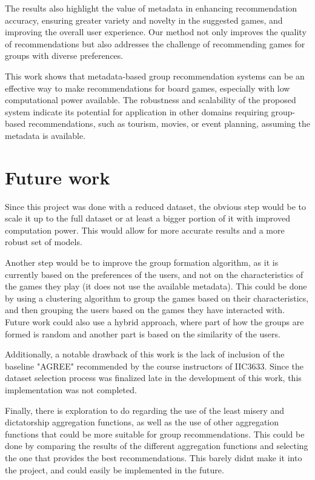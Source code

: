 \documentclass{article}
\begin{document}
The results also highlight the value of metadata in enhancing recommendation accuracy, ensuring greater variety and novelty in the suggested games, and improving the overall user experience. Our method not only improves the quality of recommendations but also addresses the challenge of recommending games for groups with diverse preferences. 

This work shows that metadata-based group recommendation systems can be an effective way to make recommendations for board games, especially with low computational power available. The robustness and scalability of the proposed system indicate its potential for application in other domains requiring group-based recommendations, such as tourism, movies, or event planning, assuming the metadata is available.

\section{Future work}

Since this project was done with a reduced dataset, the obvious step would be to scale it up to the full dataset or at least a bigger portion of it with improved computation power. This would allow for more accurate results and a more robust set of models.

Another step would be to improve the group formation algorithm, as it is currently based on the preferences of the users, and not on the characteristics of the games they play (it does not use the available metadata). This could be done by using a clustering algorithm to group the games based on their characteristics, and then grouping the users based on the games they have interacted with. Future work could also use a hybrid approach, where part of how the groups are formed is random and another part is based on the similarity of the users.

Additionally, a notable drawback of this work is the lack of inclusion of the baseline "AGREE" recommended by the course instructors of IIC3633. Since the dataset selection process was finalized late in the development of this work, this implementation was not completed.

Finally, there is exploration to do regarding the use of the least misery and dictatorship aggregation functions, as well as the use of other aggregation functions that could be more suitable for group recommendations. This could be done by comparing the results of the different aggregation functions and selecting the one that provides the best recommendations. This barely didnt make it into the project, and could easily be implemented in the future.



\end{document}
